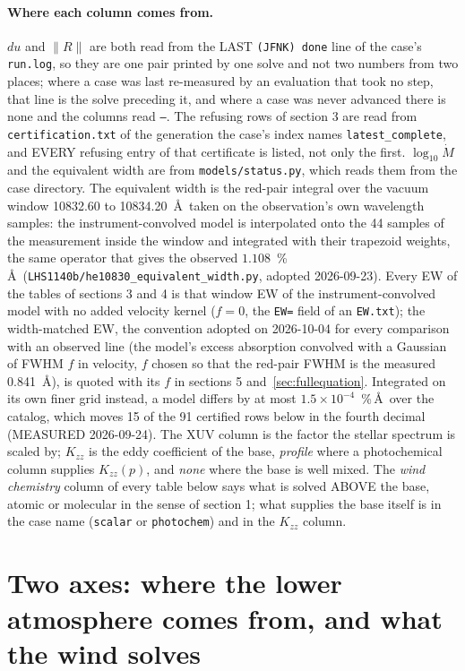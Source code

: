 \documentclass[11pt]{my_memo}
\begin{document}
\paragraph{Where each column comes from.} $du$ and $\lVert R\rVert$ are
both read from the LAST \texttt{(JFNK) done} line of the case's
\texttt{run.log}, so they are one pair printed by one solve and not two
numbers from two places; where a case was last re-measured by an evaluation
that took no step, that line is the solve preceding it, and where a case was
never advanced there is none and the columns read \texttt{--}. The refusing
rows of section 3 are read from \texttt{certification.txt} of the generation
the case's index names \texttt{latest\_complete}, and EVERY refusing entry of
that certificate is listed, not only the first. $\log_{10}\dot{M}$ and the
equivalent width are from \texttt{models/status.py}, which reads them from
the case directory. The equivalent width is the red-pair integral over the
vacuum window 10832.60 to 10834.20~\AA\ taken on the observation's own
wavelength samples: the instrument-convolved model is interpolated onto the 44
samples of the measurement inside the window and integrated with their
trapezoid weights, the same operator that gives the observed
$1.108$~\%\,\AA\ (\texttt{LHS1140b/he10830\_equivalent\_width.py}, adopted
2026-09-23). Every EW of the tables of sections 3 and 4 is that window EW
of the instrument-convolved model with no added velocity kernel ($f = 0$,
the \texttt{EW=} field of an \texttt{EW.txt}); the width-matched EW, the
convention adopted on 2026-10-04 for every comparison with an observed line
(the model's excess absorption convolved with a Gaussian of FWHM $f$ in
velocity, $f$ chosen so that the red-pair FWHM is the measured
0.841~\AA), is quoted with its $f$ in sections 5 and~\ref{sec:fullequation}. Integrated on its own finer grid instead, a model differs by at
most $1.5\times10^{-4}$~\%\,\AA\ over the catalog, which moves 15 of the
91 certified rows below in the fourth decimal (MEASURED 2026-09-24). The XUV column is the factor the stellar spectrum is scaled
by; $K_{zz}$ is the eddy coefficient of the base, \emph{profile} where a
photochemical column supplies $K_{zz}(p)$, and \emph{none} where the base is
well mixed. The \emph{wind chemistry} column of every table below says what
is solved ABOVE the base, atomic or molecular in the sense of section 1; what
supplies the base itself is in the case name (\texttt{scalar} or
\texttt{photochem}) and in the $K_{zz}$ column.

\section{Two axes: where the lower atmosphere comes from, and what the wind solves}
\end{document}
